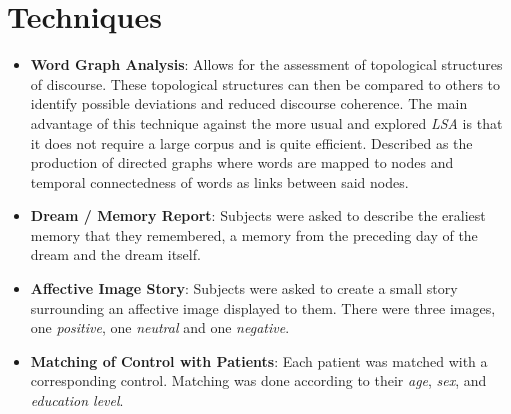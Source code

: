 \documentclass{Paper_Summary}
\begin{document}
\section{Techniques}
    \begin{itemize}
        \item \textbf{Word Graph Analysis}: Allows for the assessment of topological structures of discourse. These topological structures can then be compared to others to identify possible deviations and reduced discourse coherence. The main advantage of this technique against the more usual and explored \emph{LSA} is that it does not require a large corpus and is quite efficient. Described as the production of directed graphs where words are mapped to nodes and temporal connectedness of words as links between said nodes.
        \item \textbf{Dream / Memory Report}: Subjects were asked to describe the eraliest memory that they remembered, a memory from the preceding day of the dream and the dream itself.
        \item \textbf{Affective Image Story}: Subjects were asked to create a small story surrounding an affective image displayed to them. There were three images, one \emph{positive}, one \emph{neutral} and one \emph{negative}.
        \item \textbf{Matching of Control with Patients}: Each patient was matched with a corresponding control. Matching was done according to their \emph{age}, \emph{sex}, and \emph{education level}.
        
    \end{itemize}
\end{document}
